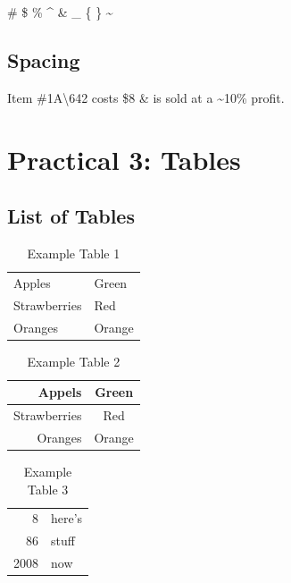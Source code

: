 \documentclass[a4paper,12pt]{report}
\begin{document}
\# \$ \% \^{} \& \_ \{ \} \~{}

\section{Spacing}
\vspace{12pt}
\vspace{12pt}
\vspace{12pt}

Item \#1A\textbackslash642 costs \$8 \& is sold at a \~{}10\% profit.


\chapter*{Practical 3: Tables}

\section{List of Tables}

\begin{table}[ht]
\label{Table 1}
	\begin{tabular}{|l|l|}
	Apples & Green\\
	Strawberries & Red\\
	Oranges & Orange\\
	\end{tabular}
\caption{Example Table 1}
\label{Table 1}
\end{table}

\begin{table}[ht]
\label{Table 2}
	\begin{tabular}{rc}
	Appels & Green\\
	\hline
	Strawberries & Red\\
	\cline{2-2}
	Oranges & Orange\\
	\end{tabular}
\caption{Example Table 2}
\end{table}

\begin{table}[ht]
\label{Table 3}
\begin{tabular}{|r|l|}
	\hline
	8 & here's\\
	\cline{2-2}
	86 & stuff\\
	\hline
	\hline
	2008 & now\\
	\hline
	\end{tabular}
\caption{Example Table 3}
\end{table}
\end{document}
